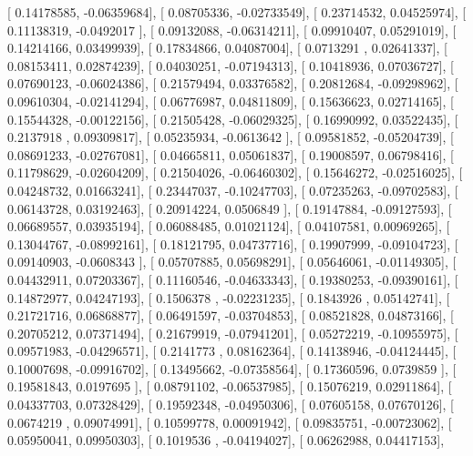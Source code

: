 \documentclass{article}
\begin{document}
       [ 0.14178585, -0.06359684],
       [ 0.08705336, -0.02733549],
       [ 0.23714532,  0.04525974],
       [ 0.11138319, -0.0492017 ],
       [ 0.09132088, -0.06314211],
       [ 0.09910407,  0.05291019],
       [ 0.14214166,  0.03499939],
       [ 0.17834866,  0.04087004],
       [ 0.0713291 ,  0.02641337],
       [ 0.08153411,  0.02874239],
       [ 0.04030251, -0.07194313],
       [ 0.10418936,  0.07036727],
       [ 0.07690123, -0.06024386],
       [ 0.21579494,  0.03376582],
       [ 0.20812684, -0.09298962],
       [ 0.09610304, -0.02141294],
       [ 0.06776987,  0.04811809],
       [ 0.15636623,  0.02714165],
       [ 0.15544328, -0.00122156],
       [ 0.21505428, -0.06029325],
       [ 0.16990992,  0.03522435],
       [ 0.2137918 ,  0.09309817],
       [ 0.05235934, -0.0613642 ],
       [ 0.09581852, -0.05204739],
       [ 0.08691233, -0.02767081],
       [ 0.04665811,  0.05061837],
       [ 0.19008597,  0.06798416],
       [ 0.11798629, -0.02604209],
       [ 0.21504026, -0.06460302],
       [ 0.15646272, -0.02516025],
       [ 0.04248732,  0.01663241],
       [ 0.23447037, -0.10247703],
       [ 0.07235263, -0.09702583],
       [ 0.06143728,  0.03192463],
       [ 0.20914224,  0.0506849 ],
       [ 0.19147884, -0.09127593],
       [ 0.06689557,  0.03935194],
       [ 0.06088485,  0.01021124],
       [ 0.04107581,  0.00969265],
       [ 0.13044767, -0.08992161],
       [ 0.18121795,  0.04737716],
       [ 0.19907999, -0.09104723],
       [ 0.09140903, -0.0608343 ],
       [ 0.05707885,  0.05698291],
       [ 0.05646061, -0.01149305],
       [ 0.04432911,  0.07203367],
       [ 0.11160546, -0.04633343],
       [ 0.19380253, -0.09390161],
       [ 0.14872977,  0.04247193],
       [ 0.1506378 , -0.02231235],
       [ 0.1843926 ,  0.05142741],
       [ 0.21721716,  0.06868877],
       [ 0.06491597, -0.03704853],
       [ 0.08521828,  0.04873166],
       [ 0.20705212,  0.07371494],
       [ 0.21679919, -0.07941201],
       [ 0.05272219, -0.10955975],
       [ 0.09571983, -0.04296571],
       [ 0.2141773 ,  0.08162364],
       [ 0.14138946, -0.04124445],
       [ 0.10007698, -0.09916702],
       [ 0.13495662, -0.07358564],
       [ 0.17360596,  0.0739859 ],
       [ 0.19581843,  0.0197695 ],
       [ 0.08791102, -0.06537985],
       [ 0.15076219,  0.02911864],
       [ 0.04337703,  0.07328429],
       [ 0.19592348, -0.04950306],
       [ 0.07605158,  0.07670126],
       [ 0.0674219 ,  0.09074991],
       [ 0.10599778,  0.00091942],
       [ 0.09835751, -0.00723062],
       [ 0.05950041,  0.09950303],
       [ 0.1019536 , -0.04194027],
       [ 0.06262988,  0.04417153],
\end{document}
